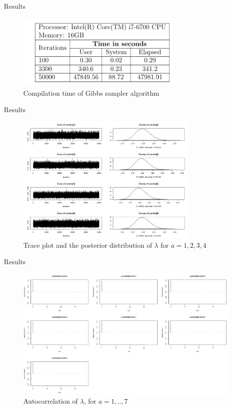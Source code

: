 \documentclass[10pt]{beamer} %
\begin{document}
\begin{frame}{Results}
\begin{figure}
    \centering
    \includegraphics[width=0.75\textwidth]{Tab1.png}
    \caption{Compilation time of Gibbs sampler algorithm}
    \label{fig:TAB1}
\end{figure}
\end{frame}

\begin{frame}{Results}
    \begin{figure}[h]
    \centering
    \includegraphics[width=0.8\textwidth]{Lambda1.JPG}
    \caption{Trace plot and the posterior distribution of $\lambda$ for $a=1,2,3,4$}
    \label{Lambda}
\end{figure}
\end{frame}

\begin{frame}{Results}
    \begin{figure}[H]
    \centering
    \includegraphics[width=1\textwidth ]{Auto_cor_LAMBDA.png}
    \caption{Autocorrelation of $\lambda$, for $a=1,..,7$}
    \label{autocorLambda}
\end{figure}
\end{frame}
\end{document}
